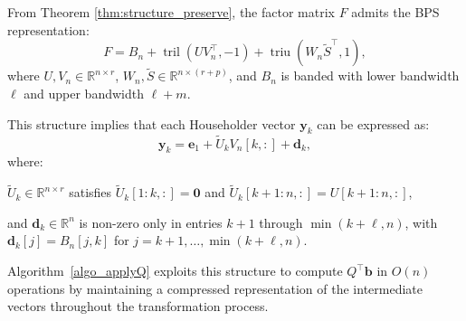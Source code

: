\documentclass[a4paper,fleqn]{cas-sc}
\def\bfy{{\mathbf y}}
\DeclareMathOperator{\triu}{triu}
\DeclareMathOperator{\tril}{tril}
\begin{document}
From Theorem \ref{thm:structure_preserve}, the factor matrix \( F \) admits the BPS representation:
\begin{equation*}
F = B_n + \tril(U V_n^\top, -1) + \triu(W_n \tilde S^\top, 1),
\end{equation*}
where \( U, V_n \in \mathbb{R}^{n \times r} \), \( W_n, \tilde S \in \mathbb{R}^{n \times (r+p)} \), and \( B_n \) is banded with lower bandwidth \( \ell \) and upper bandwidth \( \ell+m \).

This structure implies that each Householder vector \( \bfy_k \) can be expressed as:
\begin{equation}
\bfy_k = \mathbf{e}_1 + \tilde U_k V_n[k,:] + \mathbf{d}_k,
\label{eq:y_structure}
\end{equation}
where:


\( \tilde U_k \in \mathbb{R}^{n \times r} \) satisfies \( \tilde U_k[1:k,:] = \mathbf{0} \) and \( \tilde U_k[k+1:n,:] = U[k+1:n,:] \),


and \( \mathbf{d}_k \in \mathbb{R}^n \) is non-zero only in entries \( k+1 \) through \( \min(k+\ell, n) \), with \( \mathbf{d}_k[j] = B_n[j,k] \) for \( j = k+1, \ldots, \min(k+\ell, n) \).


Algorithm~\ref{algo_applyQ} exploits this structure to compute \( Q^\top\mathbf{b} \) in \( O(n) \) operations by maintaining a compressed representation of the intermediate vectors throughout the transformation process.
\end{document}

